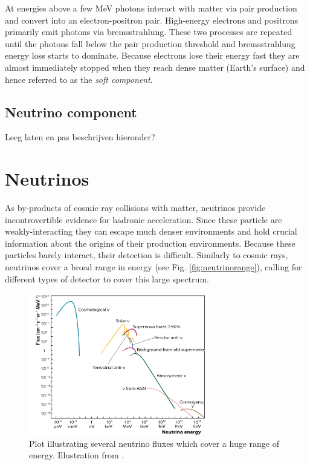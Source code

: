 At energies above a few MeV photons interact with matter via pair production and convert into an electron-positron pair. High-energy electrons and positrons primarily emit photons via bremsstrahlung. These two processes are repeated until the photons fall below the pair production threshold and bremsstrahlung energy loss starts to dominate. Because electrons lose their energy fast they are almost immediately stopped when they reach dense matter (Earth's surface) and hence referred to as the \textit{soft component}.
\subsection{Neutrino component}
Leeg laten en pas beschrijven hieronder?



\section{Neutrinos}
As by-products of cosmic ray collisions with matter, neutrinos provide incontrovertible evidence for hadronic acceleration. Since these particle are weakly-interacting they can escape much denser environments and hold crucial information about the origins of their production environments. Because these particles barely interact, their detection is difficult. Similarly to cosmic rays, neutrinos cover a broad range in energy (see Fig. \ref{fig:neutrinorange}), calling for different types of detector to cover this large spectrum. 

\begin{figure}[t]
\centering
\includegraphics[width=0.7\textwidth]{chapter3/img/neutrinospectrum.png}
\caption{Plot illustrating several neutrino fluxes which cover a huge range of energy. Illustration from \cite{Katz:2011ke}.}
\end{figure}

